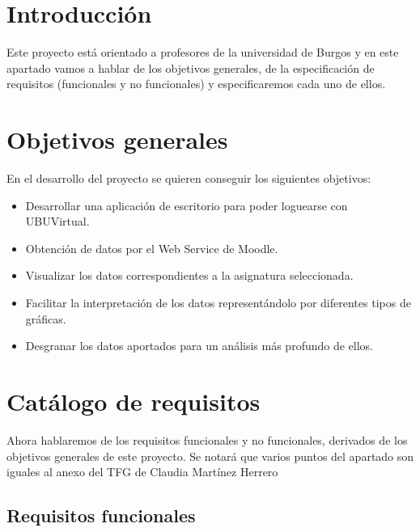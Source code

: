 
\section{Introducción}

Este proyecto está orientado a profesores de la universidad de Burgos y en este apartado vamos a hablar de los objetivos generales, de la especificación de requisitos (funcionales y no funcionales) y especificaremos cada uno de ellos.

\section{Objetivos generales}

En el desarrollo del proyecto se quieren conseguir los siguientes objetivos:

\begin{itemize}
	\tightlist
	\item
	Desarrollar una aplicación de escritorio para poder loguearse con UBUVirtual.
	\item
	Obtención de datos por el Web Service de Moodle.
	\item
	Visualizar los datos correspondientes a la asignatura seleccionada.
	\item
	Facilitar la interpretación de los datos representándolo por diferentes tipos de gráficas.
	\item
	Desgranar los datos aportados para un análisis más profundo de ellos.
\end{itemize}

\section{Catálogo de requisitos}

Ahora hablaremos de los requisitos funcionales y no funcionales, derivados de los objetivos generales de este proyecto. Se notará que varios puntos del apartado son iguales al anexo del TFG de Claudia Martínez Herrero \cite{claudia:anexo}

\subsection{Requisitos funcionales}\label{requisitos-funcionales}

